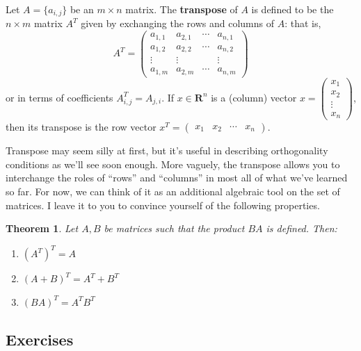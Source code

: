 \documentclass[12pt]{article}
\numberwithin{equation}{subsection}
\numberwithin{figure}{subsection}
\newtheorem{thm}[subsection]{Theorem}
\theoremstyle{note}
\begin{document}
Let $A=\{a_{i,j}\}$ be an $m\times n$ matrix. The \textbf{transpose} of $A$ is defined to be the $n\times m$ matrix $A^T$ given by exchanging the rows and columns of $A$: that is, 
\begin{equation}
A^T=\begin{pmatrix} a_{1,1} & a_{2,1} & \cdots & a_{n,1} \\
a_{1,2} & a_{2,2} & \cdots & a_{n,2} \\
\vdots & \vdots & & \vdots \\
a_{1,m} & a_{2,m} &\cdots & a_{n,m}
\end{pmatrix}
\end{equation}
or in terms of coefficients $A^T_{i,j}=A_{j,i}$. If $x\in\mathbf{R}^n$ is a (column) vector $x=\begin{pmatrix} x_1 \\ x_2 \\ \vdots \\ x_n\end{pmatrix}$, then its transpose is the row vector $x^T=\begin{pmatrix} x_1 & x_2 & \cdots & x_n \end{pmatrix}$.

Transpose may seem silly at first, but it's useful in describing orthogonality conditions as we'll see soon enough. More vaguely, the transpose allows you to interchange the roles of ``rows'' and ``columns'' in most all of what we've learned so far. For now, we can think of it as an additional algebraic tool on the set of matrices. I leave it to you to convince yourself of the following properties.

\begin{thm} \label{thm-transpose}
Let $A,B$ be matrices such that the product $BA$ is defined. Then: \begin{enumerate}
	\item $(A^T)^T=A$
	\item $(A+B)^T=A^T+B^T$
	\item $(BA)^T=A^TB^T$
\end{enumerate}
\end{thm}

\subsection{Exercises}
\end{document}
